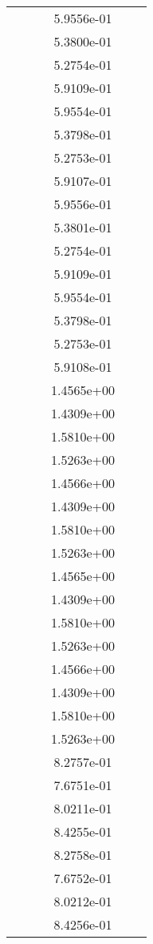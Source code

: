 \begin{xltabular}{\textwidth}{r|rS[table-format=1.3e+2]S[table-format=1.4e+2]S[table-format=1.4e+2]S[table-format=-1.5]}
&  &  & 5.9556e-01 & & \\
&  &  & 5.3800e-01 & & \\
&  &  & 5.2754e-01 & & \\
&  &  & 5.9109e-01 & & \\
&  &  & 5.9554e-01 & & \\
&  &  & 5.3798e-01 & & \\
&  &  & 5.2753e-01 & & \\
&  &  & 5.9107e-01 & & \\
&  &  & 5.9556e-01 & & \\
&  &  & 5.3801e-01 & & \\
&  &  & 5.2754e-01 & & \\
&  &  & 5.9109e-01 & & \\
&  &  & 5.9554e-01 & & \\
&  &  & 5.3798e-01 & & \\
&  &  & 5.2753e-01 & & \\
&  &  & 5.9108e-01 & & \\
&  &  & 1.4565e+00 & & \\
&  &  & 1.4309e+00 & & \\
&  &  & 1.5810e+00 & & \\
&  &  & 1.5263e+00 & & \\
&  &  & 1.4566e+00 & & \\
&  &  & 1.4309e+00 & & \\
&  &  & 1.5810e+00 & & \\
&  &  & 1.5263e+00 & & \\
&  &  & 1.4565e+00 & & \\
&  &  & 1.4309e+00 & & \\
&  &  & 1.5810e+00 & & \\
&  &  & 1.5263e+00 & & \\
&  &  & 1.4566e+00 & & \\
&  &  & 1.4309e+00 & & \\
&  &  & 1.5810e+00 & & \\
&  &  & 1.5263e+00 & & \\
&  &  & 8.2757e-01 & & \\
&  &  & 7.6751e-01 & & \\
&  &  & 8.0211e-01 & & \\
&  &  & 8.4255e-01 & & \\
&  &  & 8.2758e-01 & & \\
&  &  & 7.6752e-01 & & \\
&  &  & 8.0212e-01 & & \\
&  &  & 8.4256e-01 & & \\

\end{xltabular}
